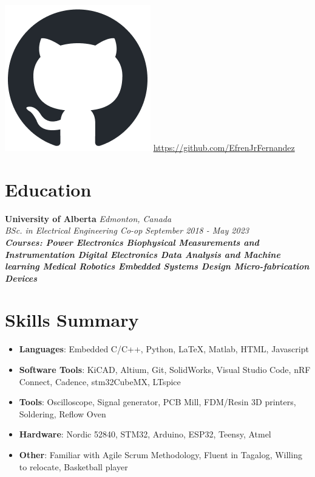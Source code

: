 \documentclass[a4paper,20pt]{article}
\newcommand{\resumeItem}[2]{
  \item\small{
    \textbf{#1}{: #2 \vspace{-2pt}}
  }
}
\newcommand{\resumeSubItem}[2]{\resumeItem{#1}{#2}\vspace{-3pt}}
\newcommand{\resumeSubHeadingListStart}{\begin{itemize}[leftmargin=*]}
\newcommand{\resumeSubHeadingListEnd}{\end{itemize}}
\begin{document}
\begin{center}
    \includegraphics[scale = 0.15]{images/github-mark.png}
    \href{https://github.com/EfrenJrFernandez}{https://github.com/EfrenJrFernandez}
    
\end{center}


\section{Education}
    \vspace{-1pt}
        \textbf{University of Alberta} \hspace{10.7cm}
        \textit{Edmonton, Canada} \\
        \textit{BSc. in Electrical Engineering Co-op}\hspace{8.25 cm}
        \textit{September 2018 - May 2023} \\
        \vspace{-10pt}
      {\scriptsize \textit{ \footnotesize{\newline{}\textbf{Courses: Power Electronics \textbullet{} Biophysical Measurements and Instrumentation \textbullet{} Digital Electronics \textbullet{} Data Analysis and Machine learning \textbullet{} Medical Robotics \textbullet{} Embedded Systems Design \textbullet{} Micro-fabrication Devices } }}}

\section{Skills Summary}
	\resumeSubHeadingListStart
	\resumeSubItem{Languages}{\hspace{3em}Embedded C/C++, Python, LaTeX, Matlab, HTML, Javascript}
	\resumeSubItem{Software Tools}{\hspace{0.8em}KiCAD, Altium, Git, SolidWorks, Visual Studio Code, nRF Connect, Cadence, stm32CubeMX, LTspice}
	\resumeSubItem{Tools}{\hspace{5.5em}Oscilloscope, Signal generator, PCB Mill, FDM/Resin 3D printers, Soldering, Reflow Oven}
    \resumeSubItem{Hardware}{\hspace{3.3em}Nordic 52840, STM32, Arduino, ESP32, Teensy, Atmel}
    \resumeSubItem{Other}{\hspace{5.3em}Familiar with Agile Scrum Methodology, Fluent in Tagalog, Willing to relocate, Basketball player}
    \resumeSubHeadingListEnd
\vspace{-3pt}
\end{document}

